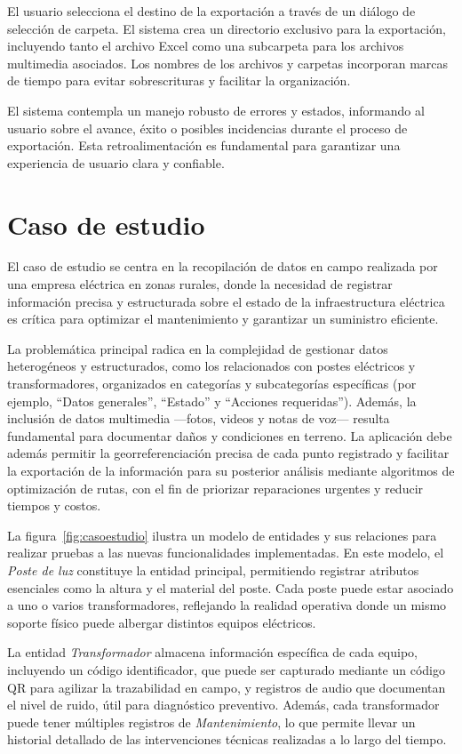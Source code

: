 \documentclass[12pt, a4paper]{book}
\begin{document}
El usuario selecciona el destino de la exportación a través de un diálogo de selección de carpeta. El sistema crea un directorio exclusivo para la exportación, incluyendo tanto el archivo Excel como una subcarpeta para los archivos multimedia asociados. Los nombres de los archivos y carpetas incorporan marcas de tiempo para evitar sobrescrituras y facilitar la organización.

El sistema contempla un manejo robusto de errores y estados, informando al usuario sobre el avance, éxito o posibles incidencias durante el proceso de exportación. Esta retroalimentación es fundamental para garantizar una experiencia de usuario clara y confiable.


\chapter{Caso de estudio}

El caso de estudio se centra en la recopilación de datos en campo realizada por una empresa eléctrica en zonas rurales, donde la necesidad de registrar información precisa y estructurada sobre el estado de la infraestructura eléctrica es crítica para optimizar el mantenimiento y garantizar un suministro eficiente.

La problemática principal radica en la complejidad de gestionar datos heterogéneos y estructurados, como los relacionados con postes eléctricos y transformadores, organizados en categorías y subcategorías específicas (por ejemplo, “Datos generales”, “Estado” y “Acciones requeridas”). Además, la inclusión de datos multimedia —fotos, videos y notas de voz— resulta fundamental para documentar daños y condiciones en terreno. La aplicación debe además permitir la georreferenciación precisa de cada punto registrado y facilitar la exportación de la información para su posterior análisis mediante algoritmos de optimización de rutas, con el fin de priorizar reparaciones urgentes y reducir tiempos y costos.

La figura~\ref{fig:casoestudio} ilustra un modelo de entidades y sus relaciones para realizar pruebas a las nuevas funcionalidades implementadas. En este modelo, el \textit{Poste de luz} constituye la entidad principal, permitiendo registrar atributos esenciales como la altura y el material del poste. Cada poste puede estar asociado a uno o varios transformadores, reflejando la realidad operativa donde un mismo soporte físico puede albergar distintos equipos eléctricos.

La entidad \textit{Transformador} almacena información específica de cada equipo, incluyendo un código identificador, que puede ser capturado mediante un código QR para agilizar la trazabilidad en campo, y registros de audio que documentan el nivel de ruido, útil para diagnóstico preventivo. Además, cada transformador puede tener múltiples registros de \textit{Mantenimiento}, lo que permite llevar un historial detallado de las intervenciones técnicas realizadas a lo largo del tiempo.
\end{document}
